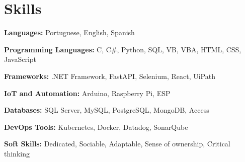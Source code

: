 \section{Skills}
	\begin{SkillHighlights} %
		\item \textbf{Languages:} Portuguese, English, Spanish
		\item \textbf{Programming Languages:} C, C\#, Python, SQL, VB, VBA, HTML, CSS, JavaScript
		\item \textbf{Frameworks:} .NET Framework, FastAPI, Selenium, React, UiPath
		\item \textbf{IoT and Automation:} Arduino, Raspberry Pi, ESP
				
		\switchcolumn %
		
		\item \textbf{Databases:} SQL Server, MySQL, PostgreSQL, MongoDB, Access		
		\item \textbf{DevOps Tools:} Kubernetes, Docker, Datadog, SonarQube
		\item \textbf{Soft Skills:} Dedicated, Sociable, Adaptable, Sense of ownership, Critical thinking
	\end{SkillHighlights}